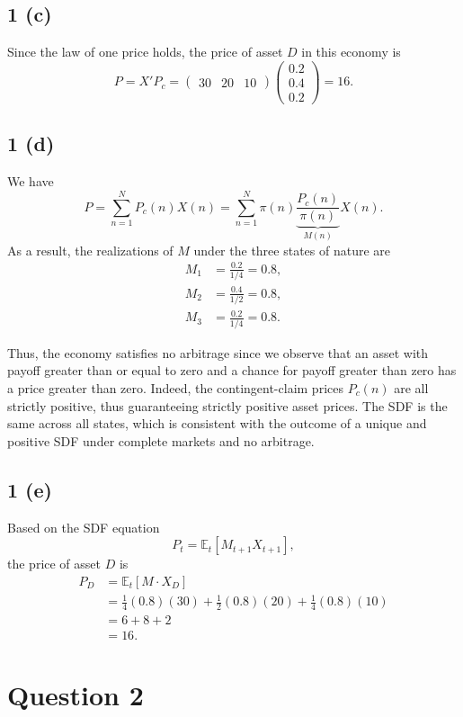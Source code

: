 \documentclass[11pt]{article}
\begin{document}
\subsection*{1 (c)}
Since the law of one price holds, the price of asset $D$ in this economy is
\[
P=X'P_c
=
\begin{pmatrix}
30 & 20 & 10
\end{pmatrix}
\begin{pmatrix}
0.2 \\
0.4 \\
0.2
\end{pmatrix}
=16.
\]

\subsection*{1 (d)}
We have
\[
P
=\sum_{n=1}^{N}P_c(n)X(n)
=\sum_{n=1}^{N}\pi(n)
\underbrace{\frac{P_c(n)}{\pi(n)}}_{M(n)}X(n).
\]
As a result, the realizations of $M$ under the three states of nature are
\begin{align*}
M_1&=\frac{0.2}{1/4}=0.8, \\
M_2&=\frac{0.4}{1/2}=0.8, \\
M_3&=\frac{0.2}{1/4}=0.8.
\end{align*}

Thus, the economy satisfies no arbitrage since we observe that an asset with
payoff greater than or equal to zero and a chance for payoff greater than zero
has a price greater than zero. Indeed, the contingent-claim prices $P_c(n)$
are all strictly positive, thus guaranteeing strictly positive asset prices.
The SDF is the same across all states, which is consistent with the outcome of
a unique and positive SDF under complete markets and no arbitrage.

\subsection*{1 (e)}
Based on the SDF equation
\[
P_t=\mathbb{E}_t\!\left[M_{t+1}X_{t+1}\right],
\]
the price of asset $D$ is
\begin{align*}
P_D
&=\mathbb{E}_t[M\cdot X_D] \\
&=\frac{1}{4}(0.8)(30)
+\frac{1}{2}(0.8)(20)
+\frac{1}{4}(0.8)(10) \\
&=6+8+2 \\
&=16.
\end{align*}

\section*{Question 2}
\end{document}
